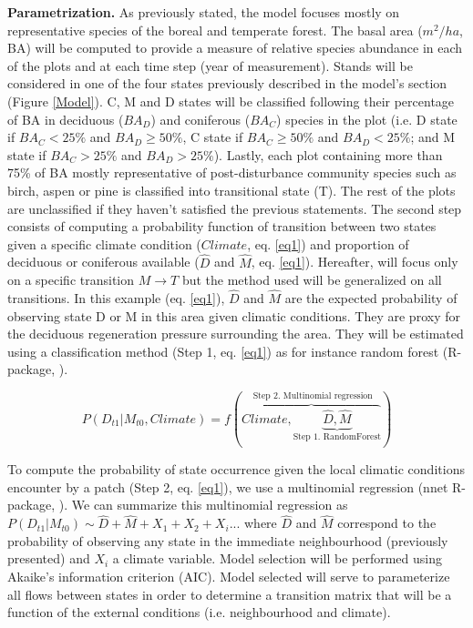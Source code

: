 \textbf{Parametrization.} As previously stated, the model focuses mostly on
representative species of the boreal and temperate forest. The basal area
($m^2/ha$, BA) will be computed to provide a measure of relative species
abundance in each of the plots and at each time step (year of measurement).
Stands will be considered in one of the four states previously described in
the model's section (Figure \ref{Model}). C, M and D states will be classified
following their percentage of BA in deciduous ($BA_D$) and coniferous ($BA_C$)
species in the plot (i.e. D state if $BA_C < 25\%$ and $BA_D \geq 50\%$, C
state if ${BA}_C \geq 50\%$ and $BA_D < 25\%$; and M state if $BA_C > 25\%$
and $BA_D > 25\%$). Lastly, each plot containing more than 75\% of BA mostly
representative of post-disturbance community species such as birch, aspen or
pine is classified into transitional state (T). The rest of the plots are
unclassified if they haven't satisfied the previous statements. The second
step consists of computing a probability function of transition between two
states given a specific climate condition ($Climate$, eq. \ref{eq1}) and
proportion of deciduous or coniferous available ($\hat{D}$ and $\hat{M}$, eq.
\ref{eq1}).  Hereafter, will focus only on a specific transition $M
\rightarrow T$ but the method used will be generalized on all transitions.  In
this example (eq. \ref{eq1}),  $\hat{D}$ and $\hat{M}$ are the expected
probability of observing state D or M in this area given climatic conditions.
They are proxy for the deciduous regeneration pressure surrounding the area.
They will be estimated using  a classification method (Step 1, eq. \ref{eq1})
as for instance random forest (R-package, \cite{Liaw2002a}).

\begin{equation}
	P(D_{t1}|M_{t0}, Climate) = f(\overbrace{Climate, \underbrace{\hat{D}, \hat{M}}_\text{Step 1. RandomForest}}^\text{ Step 2. Multinomial regression})
\label{eq1}
\end{equation}


To compute the probability of state occurrence given the local climatic
conditions encounter by a patch (Step 2, eq. \ref{eq1}), we use a multinomial
regression (nnet R-package, \cite{Venables2002}). We can summarize this
multinomial regression as $P(D_{t1}|M_{t0}) \sim \hat{D} + \hat{M} +
X_1+X_2+X_i... $ where $\hat{D}$ and $\hat{M}$ correspond to the probability
of observing any state in the immediate neighbourhood (previously presented)
and $X_i$ a climate variable. Model selection will be performed using Akaike's
information criterion (AIC). Model selected will serve to parameterize all
flows between states in order to determine a transition matrix that will be a
function of the external conditions (i.e. neighbourhood and climate).   \\

